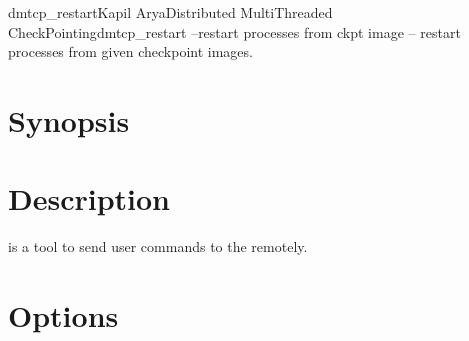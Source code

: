 

\begin{Name}{1}{dmtcp\_restart}{Kapil Arya}{Distributed MultiThreaded CheckPointing}{dmtcp\_restart --restart processes from ckpt image}
   -- restart processes from given checkpoint images.
\end{Name}

\section{Synopsis}

   

\section{Description}

 is a tool to send user commands to the
 remotely.

\section{Options}

